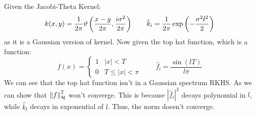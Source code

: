 \begin{remark}
    Given the Jacobi-Theta Kernel:
    \begin{equation*}
        k(x, y) = \frac{1}{2\pi}\vartheta\left( \frac{x-y}{2\pi}, \frac{i\sigma^2}{2\pi} \right) \qquad \hat{k}_i =\frac{1}{2\pi}\exp\left( -\frac{\sigma^2l^2}{2} \right)
    \end{equation*}
    as it is a Gaussian version of  kernel. Now given the top hat function, which is a function:
    \begin{equation*}
        f(x) = \begin{cases}
            1 &|x|<T \\
            0 &T\le|x|<\pi
        \end{cases} \qquad \hat{f}_l = \frac{\sin(lT)}{l\pi}
    \end{equation*}
    We can see that the top hat function isn't in a Gaussian spectrum RKHS. As we can show that $\left\lVert f\right\rVert^2_\mathcal{H}$ won't converge. This is because $|\hat{f}_l|^2$ decays polynomial in $l$, while $\hat{k}_l$ decays in exponential of $l$. Thus, the norm doesn't converge.
\end{remark}

